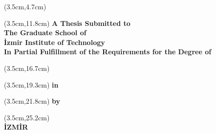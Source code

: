 \thispagestyle{empty}
	
\begin{textblock*}{\textwidth}(3.5cm,4.7cm)
	\centering
	\fontsize{18}{19}\selectfont\bfseries
	\MakeUppercase{\ThesisTitle}\par
\end{textblock*}

\begin{textblock*}{\textwidth}(3.5cm,11.8cm)
	\centering
	{\fontsize{14}{16}\selectfont\bfseries
		A Thesis Submitted to\\
		The Graduate School of\\
		İzmir Institute of Technology\\
		In Partial Fulfillment of the Requirements for the Degree of
	}
\end{textblock*}

\begin{textblock*}{\textwidth}(3.5cm,16.7cm)
	\centering
	\fontsize{14}{16}\selectfont\bfseries
\end{textblock*}

\begin{textblock*}{\textwidth}(3.5cm,19.3cm)
	\centering
	\fontsize{14}{16}\selectfont\bfseries
	in \DepartmentName
\end{textblock*}

\begin{textblock*}{\textwidth}(3.5cm,21.8cm)
	\centering
	\fontsize{14}{19}\selectfont\bfseries
		by\\
		\AuthorName{ }\MakeUppercase\AuthorSurname
\end{textblock*}

\begin{textblock*}{\textwidth}(3.5cm,25.2cm)
	\centering
	\fontsize{14}{18}\selectfont\bfseries
	\DefenceMonth{, }\DefenceYear\\
	İZMİR
\end{textblock*}

~\pagebreak
